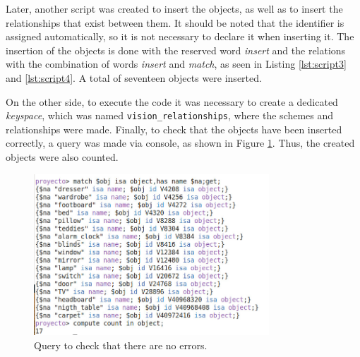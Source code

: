 Later, another script was created to insert the objects, as well as to insert the relationships that exist between them. It should be noted that the identifier is assigned automatically, so it is not necessary to declare it when inserting it. The insertion of the objects is done with the reserved word \textit{insert} and the relations with the combination of words \textit{insert} and \textit{match}, as seen in Listing \ref{lst:script3} and \ref{lst:script4}. A total of seventeen objects were inserted.





On the other side, to execute the code it was necessary to create a dedicated \textit{keyspace}, which was named \texttt{vision\_relationships}, where the schemes and relationships were made. Finally, to check that the objects have been inserted correctly, a query was made via console, as shown in Figure \ref{fig:correct}. Thus, the created objects were also counted.

\begin{figure}[H]
     \centering
     \includegraphics[width=8.8cm]{figures/numObje.jpeg}
     \caption{Query to check that there are no errors.}
     \label{fig:correct}
\end{figure}